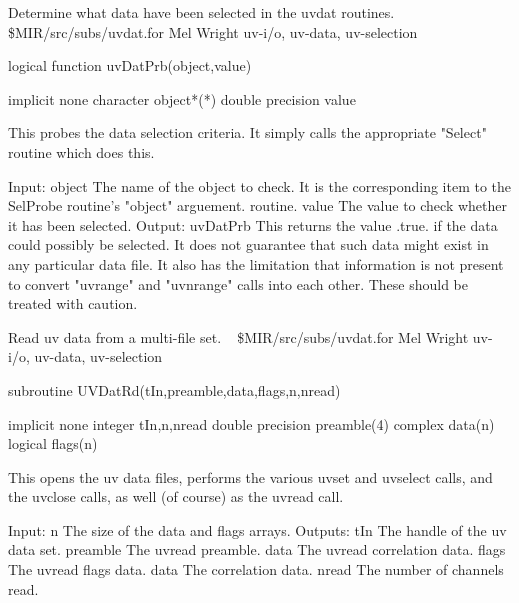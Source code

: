 %
\noindent Determine what data have been selected in the uvdat routines.
\newline \ 
\newline {} \$MIR/src/subs/uvdat.for
\newline {} Mel Wright
\newline {} uv-i/o, uv-data, uv-selection
\par{\tenpoint
{\eightpoint\begintt
        logical function uvDatPrb(object,value)

        implicit none
        character object*(*)
        double precision value

  This probes the data selection criteria. It simply calls the appropriate
  "Select" routine which does this.

  Input:
    object     The name of the object to check. It is the corresponding
               item to the SelProbe routine's "object" arguement.
               routine.
    value      The value to check whether it has been selected.
  Output:
    uvDatPrb   This returns the value .true. if the data could possibly be
               selected. It does not guarantee that such data might exist
               in any particular data file. It also has the limitation that
               information is not present to convert "uvrange" and "uvnrange"
               calls into each other. These should be treated with caution.
\endtt}
\par}
%
\noindent Read uv data from a multi-file set.
\newline \ 
\newline {} \$MIR/src/subs/uvdat.for
\newline {} Mel Wright
\newline \abox{Keywords:} uv-i/o, uv-data, uv-selection
\par{\tenpoint
{\eightpoint\begintt
        subroutine UVDatRd(tIn,preamble,data,flags,n,nread)

        implicit none
        integer tIn,n,nread
        double precision preamble(4)
        complex data(n)
        logical flags(n)

  This opens the uv data files, performs the various uvset and uvselect
  calls, and the uvclose calls, as well (of course) as the uvread call.

  Input:
    n          The size of the data and flags arrays.
  Outputs:
    tIn        The handle of the uv data set.
    preamble   The uvread preamble.
    data       The uvread correlation data.
    flags      The uvread flags data.
    data       The correlation data.
    nread      The number of channels read.
\endtt}
\par}
